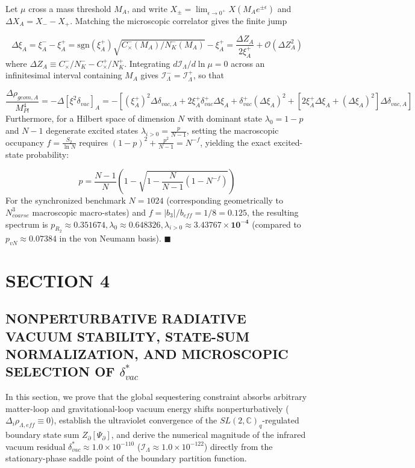 \documentclass[aps,prd,onecolumn,superscriptaddress,nofootinbib,longbibliography,10pt]{revtex4-2}
\begin{document}
  Let \(\mu\) cross a mass threshold \(M_A\), and write \(X_\pm = \lim_{\epsilon\to 0^+} X(M_A e^{\pm\epsilon})\) and \(\Delta X_A = X_- - X_+\). Matching the microscopic correlator gives the finite jump


  \[ \Delta\xi_A = \xi_A^- - \xi_A^+ = \text{sgn}(\xi_A^+)\sqrt{C_\times^-(M_A)/N_K^-(M_A)} - \xi_A^+ = \frac{\Delta Z_A}{2\xi_A^+} + \mathcal{O}(\Delta Z_A^2) \]
  where \(\Delta Z_A \equiv C_\times^-/N_K^- - C_\times^+/N_K^+\). Integrating \(d\mathcal{I}_\Lambda/d\ln\mu = 0\) across an infinitesimal interval containing \(M_A\) gives \(\mathcal{I}_\Lambda^- = \mathcal{I}_\Lambda^+\), so that


  \[ \frac{\Delta\rho_{geom,A}}{M_{Pl}^4} = -\Delta[\xi^2\delta_{vac}]_A = -\left[ (\xi_A^+)^2\Delta\delta_{vac,A} + 2\xi_A^+\delta_{vac}^+\Delta\xi_A + \delta_{vac}^+(\Delta\xi_A)^2 + [2\xi_A^+\Delta\xi_A + (\Delta\xi_A)^2]\Delta\delta_{vac,A} \right] \]
  Furthermore, for a Hilbert space of dimension \(N\) with dominant state \(\lambda_0 = 1 - p\) and \(N - 1\) degenerate excited states \(\lambda_{i>0} = \frac{p}{N-1}\), setting the macroscopic occupancy \(f = \frac{S_2}{\ln N}\) requires \((1-p)^2 + \frac{p^2}{N-1} = N^{-f}\), yielding the exact excited-state probability:


  \[ p = \frac{N - 1}{N}\left( 1 - \sqrt{1 - \frac{N}{N - 1}(1 - N^{-f})} \right) \]
  For the synchronized benchmark \(N = 1024\) (corresponding geometrically to \(N_{coarse}^3\) macroscopic macro-states) and \(f = |b_3|/b_{eff} = 1/8 = 0.125\), the resulting spectrum is \(p_{R_2} \approx \mathbf{0.351674}, \lambda_0 \approx \mathbf{0.648326}, \lambda_{i>0} \approx \mathbf{3.43767 \times 10^{-4}}\) (compared to \(p_{vN} \approx 0.07384\) in the von Neumann basis). \(\blacksquare\)




 

  
\section*{SECTION 4}

  
\subsection*{NONPERTURBATIVE RADIATIVE VACUUM STABILITY, STATE-SUM NORMALIZATION, AND MICROSCOPIC SELECTION OF \(\delta_{vac}^*\)}

  In this section, we prove that the global sequestering constraint absorbs arbitrary matter-loop and gravitational-loop vacuum energy shifts nonperturbatively (\(\Delta_i \rho_{\Lambda,eff} \equiv 0\)), establish the ultraviolet convergence of the \(SL(2,\mathbb{C})_q\)-regulated boundary state sum \(Z_\partial[\Psi_\partial]\), and derive the numerical magnitude of the infrared vacuum residual \(\delta_{vac}^* \approx 1.0 \times 10^{-110}\) (\(\mathcal{I}_\Lambda \approx 1.0 \times {10^{-122}}\)) directly from the stationary-phase saddle point of the boundary partition function.
\end{document}
